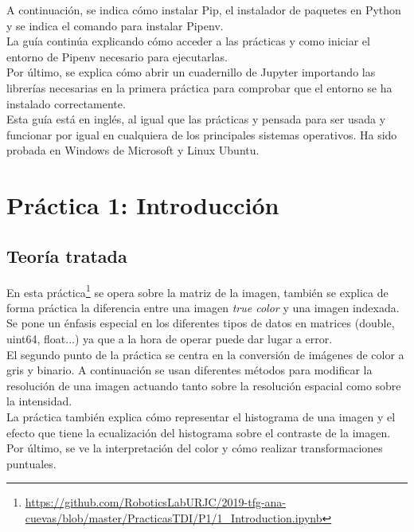 A continuación, se indica cómo instalar Pip, el instalador de paquetes en Python y se indica el comando para instalar Pipenv.\\

La guía continúa explicando cómo acceder a las prácticas y como iniciar el entorno de Pipenv necesario para ejecutarlas.\\

Por último, se explica cómo abrir un cuadernillo de Jupyter importando las librerías necesarias en la primera práctica para comprobar que el entorno se ha instalado correctamente.\\

Esta guía está en inglés, al igual que las prácticas y pensada para ser usada y funcionar por igual en cualquiera de los principales sistemas operativos. Ha sido probada en Windows de Microsoft y Linux Ubuntu.\\

\section{Práctica 1: Introducción}

\subsection{Teoría tratada}

En esta práctica\footnote{\url{https://github.com/RoboticsLabURJC/2019-tfg-ana-cuevas/blob/master/PracticasTDI/P1/1_Introduction.ipynb}} se opera sobre la matriz de la imagen, también se explica de forma práctica la diferencia entre una imagen \emph{true color} y una imagen indexada. Se pone un énfasis especial en los diferentes tipos de datos en matrices (double, uint64, float...) ya que a la hora de operar puede dar lugar a error.\\

El segundo punto de la práctica se centra en la conversión de imágenes de color a gris y binario. A continuación se usan diferentes métodos para modificar la resolución de una imagen actuando tanto sobre la resolución espacial como sobre la intensidad.\\

La práctica también explica cómo representar el histograma de una imagen y el efecto que tiene la ecualización del histograma sobre el contraste de la imagen.\\

Por último, se ve la interpretación del color y cómo realizar transformaciones puntuales.\\

